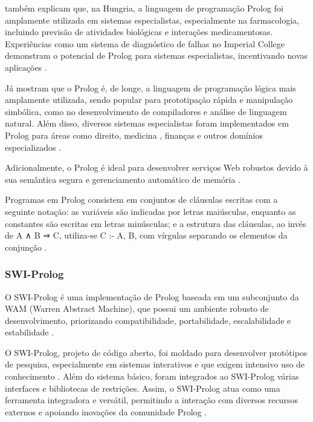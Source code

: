 \textcite{keithclark} também explicam que, na Hungria, a linguagem de programação Prolog foi amplamente utilizada em sistemas especialistas, especialmente na farmacologia, incluindo previsão de atividades biológicas e interações medicamentosas. Experiências como um sistema de diagnóstico de falhas no Imperial College demonstram o potencial de Prolog para sistemas especialistas, incentivando novas aplicações \cite{keithclark} .

Já \textcite{stuartrussel} mostram que o Prolog é, de longe, a linguagem de programação lógica mais amplamente utilizada, sendo popular para prototipação rápida e manipulação simbólica, como no desenvolvimento de compiladores e análise de linguagem natural. Além disso, diversos sistemas especialistas foram implementados em Prolog para áreas como direito, medicina \cite{jimmysingla}, finanças e outros domínios especializados \cite{stuartrussel}.

Adicionalmente, o Prolog é ideal para desenvolver serviços Web robustos devido à sua semântica segura e gerenciamento automático de memória \cite{wielemaker}.

Programas em Prolog consistem em conjuntos de cláusulas escritas com a seguinte notação:  as variáveis são indicadas por letras maiúsculas, enquanto as constantes são escritas em letras minúsculas; e  a estrutura das cláusulas, ao invés de A ∧ B ⇒ C, utiliza-se C :- A, B, com vírgulas separando os elementos da conjunção \cite{stuartrussel}.

\subsubsection{SWI-Prolog}

O SWI-Prolog é uma implementação de Prolog baseada em um subconjunto da WAM (Warren Abstract Machine), que possui um ambiente robusto de desenvolvimento, priorizando compatibilidade, portabilidade, escalabilidade e estabilidade \cite{wielemakerswiprolog}. 

O SWI-Prolog, projeto de código aberto, foi moldado para desenvolver protótipos de pesquisa, especialmente em sistemas interativos e que exigem intensivo uso de conhecimento \cite{wielemakerswiprolog2}. Além do sistema básico, foram integrados ao SWI-Prolog várias interfaces e bibliotecas de restrições. Assim, o SWI-Prolog atua como uma ferramenta integradora e versátil, permitindo a interação com diversos recursos externos e apoiando inovações da comunidade Prolog \cite{wielemakerswiprolog2}.


